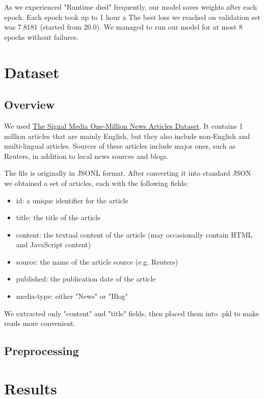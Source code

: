 As we experienced "Runtime died" frequently, our model saves weights after each epoch. Each epoch took up to 1 hour a The best loss we reached on validation set was 7.8181 (started from 20.0). We managed to run our model for at most 8 epochs without failures.


\section{Dataset}
\subsection{Overview}
We used \href{http://research.signalmedia.co/newsir16/signal-dataset.html}{The Signal Media One-Million News Articles Dataset}. It contains 1 million articles that are mainly English, but they also include non-English and multi-lingual articles. Sources of these articles include major ones, such as Reuters, in addition to local news sources and blogs.

The file is originally in JSONL format. After converting it into standard JSON we obtained a set of articles, each with the following fields:

\begin{itemize}
\setlength\itemsep{-0.1em}
\item id: a unique identifier for the article
\item title: the title of the article
\item content: the textual content of the article (may occasionally contain HTML and JavaScript content)
\item source: the name of the article source (e.g. Reuters)
\item published: the publication date of the article
\item media-type: either "News" or "Blog"
\end{itemize}  

We extracted only "content" and "title" fields, then placed them into .pkl to make reads more convenient.

\subsection{Preprocessing}

\section{Results}
